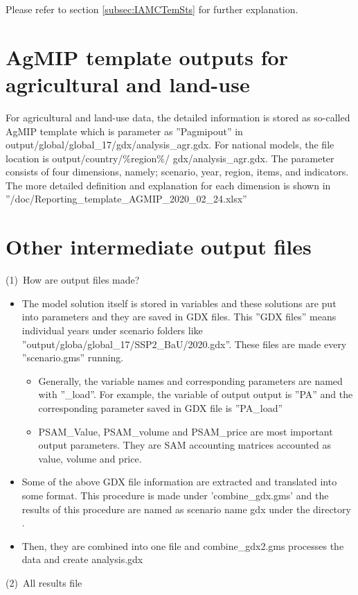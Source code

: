 \documentclass[10pt,a4paper,titlepage,dvipdfmx]{book}
\begin{document}
Please refer to section \ref{subsec:IAMCTemSts} for further explanation.

\section{\label{sec:AgMIPTemOut}AgMIP template outputs for agricultural and land-use}

     For agricultural and land-use data, the detailed information is stored as so-called AgMIP template which is parameter as ''Pagmipout'' in output/global/global\_17/gdx/analysis\_agr.gdx. For national models, the file location is output/country/\%region\%/ gdx/analysis\_agr.gdx. The parameter consists of four dimensions, namely; scenario, year, region, items, and indicators. The more detailed definition and explanation for each dimension is shown in ''/doc/Reporting\_template\_AGMIP\_2020\_02\_24.xlsx''

\section{\label{sec:OthrIntOutFile}Other intermediate output files}

(1)~How are output files made?
\begin{itemize}
\item The model solution itself is stored in variables and these solutions are put into parameters and they are saved in GDX files. This ''GDX files'' means individual years under scenario folders like ''output/globa/global\_17/SSP2\_BaU/2020.gdx''. These files are made every ''scenario.gms'' running. 
\begin{itemize}
\item Generally, the variable names and corresponding parameters are named with ''\_load''. For example, the variable of output output is ''PA'' and the corresponding parameter saved in GDX file is ''PA\_load''
\item PSAM\_Value, PSAM\_volume and PSAM\_price are most important output parameters. They are SAM accounting matrices accounted as value, volume and price.
\end{itemize}

\item Some of the above GDX file information are extracted and translated into some format. This procedure is made under 'combine\_gdx.gms' and the results of this procedure are named as scenario name gdx under the directory .
\item Then, they are combined into one file and combine\_gdx2.gms processes the data and create analysis.gdx
\end{itemize}
(2)~All results file\label{mark-(2)}
\end{document}
